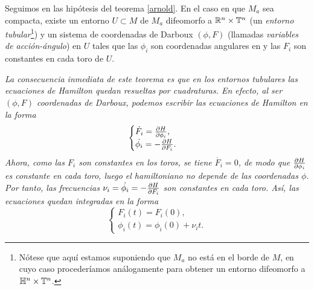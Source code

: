  \begin{thm}
   Seguimos en las hipótesis del teorema \ref{arnold}. En el caso en que $M_a$ sea compacta, existe un entorno $U\subset M$ de $M_a$ difeomorfo a $\mathbb{R}^n \times \mathbb{T}^n$ (un \emph{entorno tubular}\footnote{Nótese que aquí estamos suponiendo que $M_a$ no está en el borde de $M$, en cuyo caso procederíamos análogamente para obtener un entorno difeomorfo a $\mathbb{H}^n \times \mathbb{T}^n$.})
 y un sistema de coordenadas de Darboux $(\phi,F)$ (llamadas \emph{variables de acción-ángulo}) en $U$ tales que las $\phi_i$ son coordenadas angulares en y las $F_i$ son constantes en cada toro de $U$. 
  \end{thm}

  \begin{obs}
    \em
    La consecuencia inmediata de este teorema es que en los entornos tubulares las ecuaciones de Hamilton quedan resueltas por cuadraturas. En efecto, al ser $(\phi,F)$ coordenadas de Darboux, podemos escribir las ecuaciones de Hamilton en la forma
    \begin{equation*}
      \begin{cases}
	\dot{F_i}=\frac{\partial H}{\partial \phi_i}, \\
	\dot{\phi_i}=-\frac{\partial H}{\partial F_i}. 
      \end{cases}
    \end{equation*}
    Ahora, como las $F_i$ son constantes en los toros, se tiene $\dot{F_i}=0$, de modo que $\frac{\partial H}{\partial \phi_i}$ es constante en cada toro, luego el hamiltoniano no depende de las coordenadas $\phi$. Por tanto, las frecuencias $\nu_i=\dot{\phi_i}=-\frac{\partial H}{\partial F_i}$ son constantes en cada toro. Así, las ecuaciones quedan integradas en la forma
    \begin{equation*}
      \begin{cases}
	F_i(t)=F_i(0), \\
	\phi_i(t)=\phi_i(0)+\nu_i t. 
      \end{cases}
    \end{equation*}
  \end{obs}

